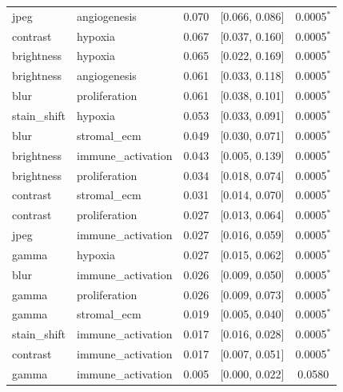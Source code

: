 \begin{table}[t]
\begin{tabular}{llccc}
jpeg & angiogenesis & 0.070 & [0.066, 0.086] & 0.0005$^{*}$ \\
contrast & hypoxia & 0.067 & [0.037, 0.160] & 0.0005$^{*}$ \\
brightness & hypoxia & 0.065 & [0.022, 0.169] & 0.0005$^{*}$ \\
brightness & angiogenesis & 0.061 & [0.033, 0.118] & 0.0005$^{*}$ \\
blur & proliferation & 0.061 & [0.038, 0.101] & 0.0005$^{*}$ \\
stain\_shift & hypoxia & 0.053 & [0.033, 0.091] & 0.0005$^{*}$ \\
blur & stromal\_ecm & 0.049 & [0.030, 0.071] & 0.0005$^{*}$ \\
brightness & immune\_activation & 0.043 & [0.005, 0.139] & 0.0005$^{*}$ \\
brightness & proliferation & 0.034 & [0.018, 0.074] & 0.0005$^{*}$ \\
contrast & stromal\_ecm & 0.031 & [0.014, 0.070] & 0.0005$^{*}$ \\
contrast & proliferation & 0.027 & [0.013, 0.064] & 0.0005$^{*}$ \\
jpeg & immune\_activation & 0.027 & [0.016, 0.059] & 0.0005$^{*}$ \\
gamma & hypoxia & 0.027 & [0.015, 0.062] & 0.0005$^{*}$ \\
blur & immune\_activation & 0.026 & [0.009, 0.050] & 0.0005$^{*}$ \\
gamma & proliferation & 0.026 & [0.009, 0.073] & 0.0005$^{*}$ \\
gamma & stromal\_ecm & 0.019 & [0.005, 0.040] & 0.0005$^{*}$ \\
stain\_shift & immune\_activation & 0.017 & [0.016, 0.028] & 0.0005$^{*}$ \\
contrast & immune\_activation & 0.017 & [0.007, 0.051] & 0.0005$^{*}$ \\
gamma & immune\_activation & 0.005 & [0.000, 0.022] & 0.0580 \\
\bottomrule
\end{tabular}
\end{table}
